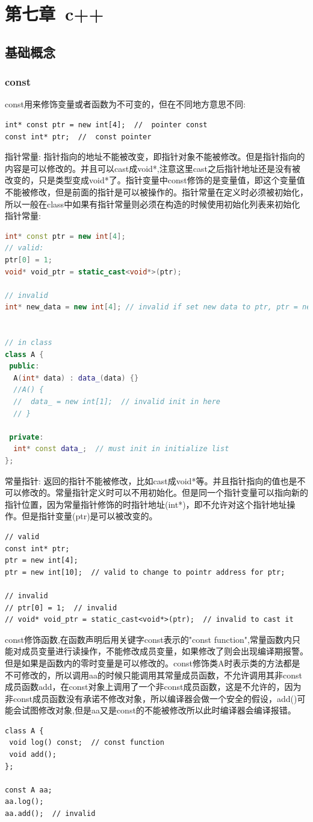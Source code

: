 \documentclass[12pt]{book}
\begin{document}
\chapter{第七章\ c++}

\section{基础概念}
\subsection{const}
const用来修饰变量或者函数为不可变的，但在不同地方意思不同:
\begin{lstlisting}
int* const ptr = new int[4];  //  pointer const
const int* ptr;  //  const pointer
\end{lstlisting}
指针常量: 指针指向的地址不能被改变，即指针对象不能被修改。但是指针指向的内容是可以修改的。并且可以cast成void*,注意这里cast之后指针地址还是没有被改变的，只是类型变成void*了。指针变量中const修饰的是变量值，即这个变量值不能被修改，但是前面的指针是可以被操作的。指针常量在定义时必须被初始化，所以一般在class中如果有指针常量则必须在构造的时候使用初始化列表来初始化指针常量:
\begin{lstlisting}[language=C++]
int* const ptr = new int[4];
// valid:
ptr[0] = 1;
void* void_ptr = static_cast<void*>(ptr);

// invalid
int* new_data = new int[4]; // invalid if set new data to ptr, ptr = new_data;


// in class
class A {
 public:
  A(int* data) : data_(data) {}
  //A() {
  //  data_ = new int[1];  // invalid init in here
  // }
	
 private:
  int* const data_;  // must init in initialize list 
};
\end{lstlisting}
常量指针: 返回的指针不能被修改，比如cast成void*等。并且指针指向的值也是不可以修改的。常量指针定义时可以不用初始化。但是同一个指针变量可以指向新的指针位置，因为常量指针修饰的时指针地址(int*)，即不允许对这个指针地址操作。但是指针变量(ptr)是可以被改变的。
\begin{lstlisting}
// valid
const int* ptr;
ptr = new int[4];
ptr = new int[10];  // valid to change to pointr address for ptr;

// invalid
// ptr[0] = 1;  // invalid
// void* void_ptr = static_cast<void*>(ptr);  // invalid to cast it
\end{lstlisting}

const修饰函数,在函数声明后用关键字const表示的"const function",常量函数内只能对成员变量进行读操作，不能修改成员变量，如果修改了则会出现编译期报警。但是如果是函数内的零时变量是可以修改的。const修饰类A时表示类的方法都是不可修改的，所以调用aa的时候只能调用其常量成员函数，不允许调用其非const成员函数add，在const对象上调用了一个非const成员函数，这是不允许的，因为非const成员函数没有承诺不修改对象，所以编译器会做一个安全的假设，add()可能会试图修改对象,但是aa又是const的不能被修改所以此时编译器会编译报错。
\begin{lstlisting}
class A {
 void log() const;  // const function
 void add();
};

const A aa;
aa.log();
aa.add();  // invalid
\end{lstlisting}
\end{document}
